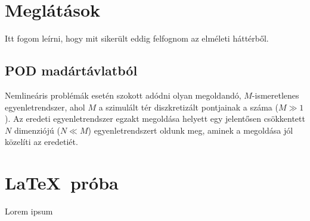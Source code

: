 \author{Szilágyi Gábor \\\vspace{2cm}\\ Konzulens: Dr. Bilicz Sándor}
\date{Budapest, \today}



    \maketitle
    \tableofcontents
    \section{Meglátások}
        Itt fogom leírni, hogy mit sikerült eddig felfognom az elméleti háttérből.
        \subsection{POD madártávlatból}
            Nemlineáris problémák esetén szokott adódni olyan megoldandó, $M$-ismeretlenes egyenletrendszer, ahol $M$ a szimulált tér diszkretizált pontjainak a száma ($M \gg 1$). Az eredeti egyenletrendszer egzakt megoldása helyett egy jelentősen csökkentett $N$ dimenziójú ($N \ll M$) egyenletrendszert oldunk meg, aminek a megoldása jól közelíti az eredetiét.
    \section{\LaTeX~próba}
            Lorem ipsum \cite{PGD}
    
    


 
